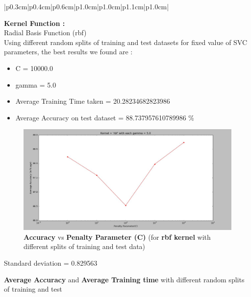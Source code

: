 \documentclass{beamer}
\begin{document}
\begin{frame}[t, allowframebreaks]
\begin{vwcol}[widths={6.5,3.0}, sep=.8cm, justify=flush, rule=0pt, indent=1em]
\begin{minipage}{0.7\linewidth}
\begin{table}[!h]
\begin{tabular}{|p{0.3cm}|p{0.4cm}|p{0.6cm}|p{1.0cm}|p{1.0cm}|p{1.1cm}|p{1.0cm}|}
\end{tabular}
\end{table}
\end{minipage}
\begin{minipage}{0.3\linewidth}
\textbf{Kernel Function :} \\
Radial Basis Function (rbf) \\

Using different random splits of training and test datasets for fixed value of SVC parameters, the best results we found are : 
\begin{itemize}
\item C = 10000.0
\item gamma = 5.0
\item Average Training Time
taken =
20.28234682823986
\item Average Accuracy on test
dataset =
88.737957610789986 \%
\end{itemize}

\end{minipage}
\end{vwcol}


\begin{figure}[!h]
  \includegraphics[width=0.8\linewidth]{kuchbhi.jpg}
  \caption*{\tiny \textbf{Accuracy }vs\textbf{ Penalty Parameter (C)} (for \textbf{rbf kernel} with different splits of training and test data)}
  \label{fig:}
\end{figure}
\begin{block}
\LARGE Standard deviation = 0.829563
\end{block}
\pagebreak

\fontsize{8}{9.6}\selectfont
\textbf{Average Accuracy} and \textbf{Average Training time} with different
random splits of training and test
\linebreak



\end{frame}
\end{document}
